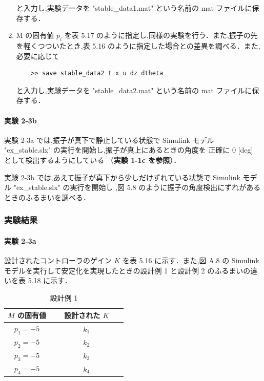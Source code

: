 \begin{enumerate}
        と入力し,実験データを "stable\_data1.mat" という名前の mat ファイルに保存する．
        
  \item M の固有値 \( p_i \) を表 5.17 のように指定し,同様の実験を行う．また,振子の先を軽くつついたとき,表 5.16 のように指定した場合との差異を調べる．また,必要に応じて
        
        \begin{tcolorbox}[colback=gray!5!white,colframe=gray!75!black]
          \begin{lstlisting}
    >> save stable_data2 t x u dz dtheta
    \end{lstlisting}
        \end{tcolorbox}
        
        と入力し,実験データを "stable\_data2.mat" という名前の mat ファイルに保存する．
\end{enumerate}

\paragraph{実験 2-3b}
実験 2-3a では,振子が真下で静止している状態で Simulink モデル 
"ex\_stable.slx" の実行を開始し,振子が真上にあるときの角度を
正確に 0 [deg] として検出するようにしている
（\textbf{実験 1-1c を参照}）．

実験 2-3b では,あえて振子が真下から少しだけずれている状態で
Simulink モデル "ex\_stable.slx" の実行を開始し
,図 5.8 のように振子の角度検出にずれがあるときのふるまいを調べる．

\subsubsection{実験結果}

\paragraph{実験 2-3a}
設計されたコントローラのゲイン \( K \) を表 5.16 に示す．また,図 A.8 の Simulink モデルを実行して安定化を実現したときの設計例 1 と設計例 2 のふるまいの違いを表 5.18 に示す．

\begin{table}[h]
  \centering
  \caption{設計例 1}
  \label{tab:design_example_1}
  \begin{tabular}{|c|c|}
    \hline
    \( M \) の固有値 & 設計された \( K \)                           \\
    \hline
    \( p_1 = -5 \)   & \( k_1 \) {\large\textbf{　　　　　　　　}}  \\
    \( p_2 = -5 \)   & \( k_2 \) {\large\textbf{　　　　　　　　}}  \\
    \( p_3 = -5 \)   & \( k_3 \)  {\large\textbf{　　　　　　　　}} \\
    \( p_4 = -5 \)   & \( k_4 \)  {\large\textbf{　　　　　　　　}} \\
    \hline
  \end{tabular}
\end{table}

